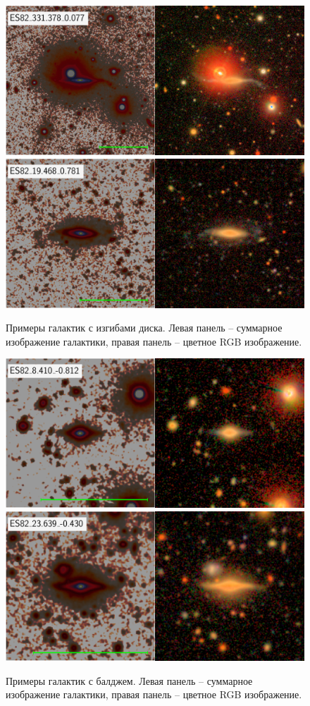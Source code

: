 \begin{figure}[ht]

    \includegraphics[width=.5\textwidth]{images/11.png}\hfill
    \includegraphics[width=.5\textwidth]{images/224.png}\hfill

    \caption{Примеры галактик с изгибами диска. Левая панель -- суммарное изображение галактики, правая панель -- цветное RGB изображение.}\label{fig:warp}
\end{figure}

\begin{figure}[ht]

    \includegraphics[width=.5\textwidth]{images/139.png}\hfill
    \includegraphics[width=.5\textwidth]{images/263.png}\hfill

    \caption{Примеры галактик с балджем. Левая панель -- суммарное изображение галактики, правая панель -- цветное RGB изображение.}\label{fig:bulge}
\end{figure}

